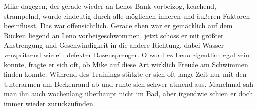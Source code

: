 \documentclass[ngerman,smalldemyvopaper,11pt,oneside,onecolumn,openright,extrafontsizes]{memoir}
\begin{document}
Mike dagegen, der gerade wieder an Lenos Bank vorbeizog, keuchend, strampelnd, wurde eindeutig durch alle möglichen inneren und äußeren Faktoren beeinflusst. Das war offensichtlich. Gerade eben war er gemächlich auf dem Rücken liegend an Leno vorbeigeschwommen, jetzt schoss er mit größter Anstrengung und Geschwindigkeit in die andere Richtung, dabei Wasser verspritzend wie ein defekter Rasensprenger. Obwohl es Leno eigentlich egal sein konnte, fragte er sich oft, ob Mike auf diese Art wirklich Freude am Schwimmen finden konnte. Während des Trainings stützte er sich oft lange Zeit nur mit den Unterarmen am Beckenrand ab und ruhte sich schwer atmend aus. Manchmal sah man ihn auch wochenlang überhaupt nicht im Bad, aber irgendwie schien er doch immer wieder zurückzufinden.
\vspace{0.5em} \\
\end{document}
